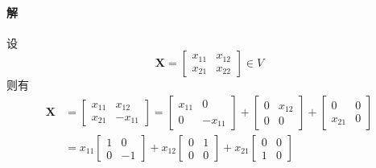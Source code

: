 \documentclass[12pt, a4paper, oneside, fontset=none]{ctexart}
\begin{document}
\paragraph*{解} 设
\[
    \bm{X} = \begin{bmatrix}
        x_{11} & x_{12} \\
        x_{21} & x_{22}
    \end{bmatrix} \in V
\]
则有
\begin{align*}
    \bm{X} & = \begin{bmatrix}
                   x_{11} & x_{12}  \\
                   x_{21} & -x_{11}
               \end{bmatrix} = \begin{bmatrix}
                                   x_{11} & 0       \\
                                   0      & -x_{11}
                               \end{bmatrix} + \begin{bmatrix}
                                                   0 & x_{12} \\
                                                   0 & 0
                                               \end{bmatrix} + \begin{bmatrix}
                                                                   0      & 0 \\
                                                                   x_{21} & 0
                                                               \end{bmatrix}      \\
           & = x_{11} \begin{bmatrix}
                          1 & 0  \\
                          0 & -1
                      \end{bmatrix} + x_{12} \begin{bmatrix}
                                                 0 & 1 \\
                                                 0 & 0
                                             \end{bmatrix} + x_{21} \begin{bmatrix}
                                                                        0 & 0 \\
                                                                        1 & 0
                                                                    \end{bmatrix}
\end{align*}
\end{document}
